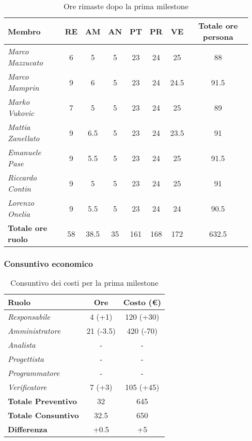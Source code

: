 \begin{table}[H]
    \centering
    \begin{tabular}{|l|c|c|c|c|c|c|c|}
    \hline
    \textbf{Membro} & \textbf{RE} & \textbf{AM} & \textbf{AN} & \textbf{PT} & \textbf{PR} & \textbf{VE} & \textbf{Totale ore persona} \\ \hline
    \textit{Marco Mazzucato}  & 6  & 5   & 5  & 23  & 24 & 25   & 88   \\ \hline
    \textit{Marco Mamprin}    & 9  & 6   & 5  & 23  & 24 & 24.5 & 91.5 \\ \hline
    \textit{Marko Vukovic}    & 7  & 5   & 5  & 23  & 24 & 25   & 89   \\ \hline
    \textit{Mattia Zanellato} & 9  & 6.5 & 5  & 23  & 24 & 23.5 & 91   \\ \hline
    \textit{Emanuele Pase}    & 9  & 5.5 & 5  & 23  & 24 & 25   & 91.5 \\ \hline
    \textit{Riccardo Contin}  & 9  & 5   & 5  & 23  & 24 & 25   & 91   \\ \hline
    \textit{Lorenzo Onelia}   & 9  & 5.5 & 5  & 23  & 24 & 24   & 90.5 \\ \hline
    \textbf{Totale ore ruolo} & 58 & 38.5& 35 & 161 & 168& 172  & 632.5\\ \hline
    \end{tabular}
    \caption{Ore rimaste dopo la prima milestone}
\end{table}

\subsubsection{Consuntivo economico}

\begin{table}[H]
    \centering
    \begin{tabular}{|l|c|c|}
    \hline
    \textbf{Ruolo} & \textbf{Ore} & \textbf{Costo (€)} \\ \hline
    \textit{Responsabile}      & 4 (+1)    & 120 (+30) \\ \hline
    \textit{Amministratore}    & 21 (-3.5) & 420 (-70) \\ \hline
    \textit{Analista}          & -         & -         \\ \hline
    \textit{Progettista}       & -         & -         \\ \hline
    \textit{Programmatore}     & -         & -         \\ \hline
    \textit{Verificatore}      & 7 (+3)    & 105 (+45) \\ \hline
    \textbf{Totale Preventivo} & 32        & 645       \\ \hline
    \textbf{Totale Consuntivo} & 32.5      & 650       \\ \hline
    \textbf{Differenza}        & +0.5      & +5       \\ \hline
    \end{tabular}
    \caption{Consuntivo dei costi per la prima milestone}
\end{table}


